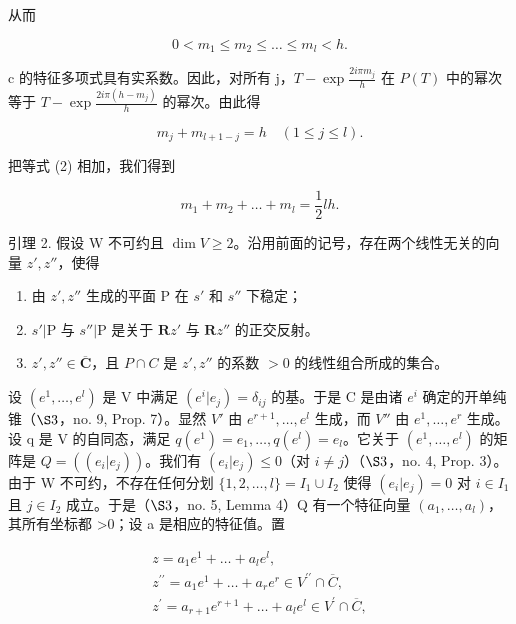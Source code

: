 从而

\[
0 <   m _ {1} \leqslant m _ {2} \leqslant \dots \leqslant m _ {l} <   h.\tag{1}
\]

c 的特征多项式具有实系数。因此，对所有 j，\(T - \exp\frac{2i\pi m_{j}}{h}\) 在 \(P(T)\) 中的幂次等于 \(T - \exp\frac{2i\pi(h - m_{j})}{h}\) 的幂次。由此得

\[
m _ {j} + m _ {l + 1 - j} = h \quad (1 \leqslant j \leqslant l).\tag{2}
\]

把等式 (2) 相加，我们得到

\[
m _ {1} + m _ {2} + \dots + m _ {l} = \frac {1}{2} l h.\tag{3}
\]

引理 2. 假设 W 不可约且 \(\dim V \geqslant 2\)。沿用前面的记号，存在两个线性无关的向量 \(z', z''\)，使得

\begin{enumerate}
\def\labelenumi{(\roman{enumi})}
\item
  由 \(z', z''\) 生成的平面 P 在 \(s'\) 和 \(s''\) 下稳定；
\item
  \(s'|\mathrm{P}\) 与 \(s''|\mathrm{P}\) 是关于 \(\mathbf{R}z'\) 与 \(\mathbf{R}z''\) 的正交反射。
\item
  \(z', z'' \in \overline{\mathbf{C}}\)，且 \(P \cap C\) 是 \(z', z''\) 的系数 \(> 0\) 的线性组合所成的集合。
\end{enumerate}

设 \((e^{1},\ldots,e^{l})\) 是 V 中满足 \((e^{i}|e_{j})=\delta_{ij}\) 的基。于是 C 是由诸 \(e^{i}\) 确定的开单纯锥（\(\S 3\)，no. 9, Prop. 7）。显然 \(V'\) 由 \(e^{r+1},\ldots,e^{l}\) 生成，而 \(V''\) 由 \(e^{1},\ldots,e^{r}\) 生成。设 q 是 V 的自同态，满足 \(q(e^{1})=e_{1},\ldots,q(e^{l})=e_{l}\)。它关于 \((e^{1},\ldots,e^{l})\) 的矩阵是 \(Q=((e_{i}|e_{j}))\)。我们有 \((e_{i}|e_{j})\leqslant0\)（对 \(i\neq j\)）（\(\S 3\)，no. 4, Prop. 3）。由于 W 不可约，不存在任何分划 \(\{1,2,\ldots,l\}=I_{1}\cup I_{2}\) 使得 \((e_{i}|e_{j})=0\) 对 \(i\in I_{1}\) 且 \(j\in I_{2}\) 成立。于是（\(\S 3\)，no. 5, Lemma 4）Q 有一个特征向量 \((a_{1},\ldots,a_{l})\)，其所有坐标都 \textgreater0；设 a 是相应的特征值。置

\[
\begin{array}{r} z = a _ {1} e ^ {1} + \dots + a _ {l} e ^ {l}, \\ z ^ {\prime \prime} = a _ {1} e ^ {1} + \dots + a _ {r} e ^ {r} \in V ^ {\prime \prime} \cap \overline {{C}}, \\ z ^ {\prime} = a _ {r + 1} e ^ {r + 1} + \dots + a _ {l} e ^ {l} \in V ^ {\prime} \cap \overline {{C}}, \end{array}
\]

